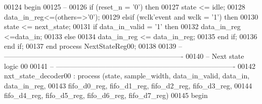 \begin{DoxyCode}
00124 \textcolor{vhdlkeyword}{    begin}
00125 \textcolor{keyword}{        --}
00126         \textcolor{keywordflow}{if} \textcolor{vhdlchar}{(}\textcolor{vhdlchar}{reset_n} \textcolor{vhdlchar}{=} \textcolor{vhdlchar}{'}\textcolor{vhdllogic}{}\textcolor{vhdllogic}{0}\textcolor{vhdlchar}{'}\textcolor{vhdlchar}{)} \textcolor{keywordflow}{then}
00127             \textcolor{vhdlchar}{state} \textcolor{vhdlchar}{<=} \textcolor{vhdlchar}{idle};
00128             \textcolor{vhdlchar}{data_in_reg}\textcolor{vhdlchar}{<=}\textcolor{vhdlchar}{(}\textcolor{keywordflow}{others}\textcolor{vhdlchar}{=}\textcolor{vhdlchar}{>}\textcolor{vhdlchar}{'}\textcolor{vhdllogic}{}\textcolor{vhdllogic}{0}\textcolor{vhdlchar}{'}\textcolor{vhdlchar}{)}; 
00129         \textcolor{keywordflow}{elsif} \textcolor{vhdlchar}{(}\textcolor{vhdlchar}{wclk}\textcolor{vhdlchar}{'}\textcolor{vhdlkeyword}{event} \textcolor{keywordflow}{and} \textcolor{vhdlchar}{wclk} \textcolor{vhdlchar}{=} \textcolor{vhdlchar}{'}\textcolor{vhdllogic}{}\textcolor{vhdllogic}{1}\textcolor{vhdlchar}{'}\textcolor{vhdlchar}{)} \textcolor{keywordflow}{then}
00130        \textcolor{vhdlchar}{state} \textcolor{vhdlchar}{<=} \textcolor{vhdlchar}{next_state};
00131        \textcolor{keywordflow}{if} \textcolor{vhdlchar}{data_in_valid} \textcolor{vhdlchar}{=} \textcolor{vhdlchar}{'}\textcolor{vhdllogic}{}\textcolor{vhdllogic}{1}\textcolor{vhdlchar}{'} \textcolor{keywordflow}{then} 
00132          \textcolor{vhdlchar}{data_in_reg} \textcolor{vhdlchar}{<=}\textcolor{vhdlchar}{data_in};
00133        \textcolor{keywordflow}{else} 
00134          \textcolor{vhdlchar}{data_in_reg} \textcolor{vhdlchar}{<=} \textcolor{vhdlchar}{data_in_reg};
00135        \textcolor{keywordflow}{end} \textcolor{keywordflow}{if};
00136         \textcolor{keywordflow}{end} \textcolor{keywordflow}{if};
00137     \textcolor{keywordflow}{end} \textcolor{keywordflow}{process} \textcolor{vhdlchar}{NextStateReg00};
00138     
00139 \textcolor{keyword}{-- ----------------------------------------------------------------------------}
00140 \textcolor{keyword}{-- Next state logic 00}
00141 \textcolor{keyword}{-- ----------------------------------------------------------------------------}
00142     nxt\_state\_decoder00 : \textcolor{keywordflow}{process} (state, sample_width, data_in_valid, data_in, 
      data_in_reg, 
00143                                             fifo_d0_reg, fifo_d1_reg, 
      fifo_d2_reg, fifo_d3_reg, 
00144                                             fifo_d4_reg, fifo_d5_reg, 
      fifo_d6_reg, fifo_d7_reg)
00145 \textcolor{vhdlkeyword}{    begin}

\end{DoxyCode}
